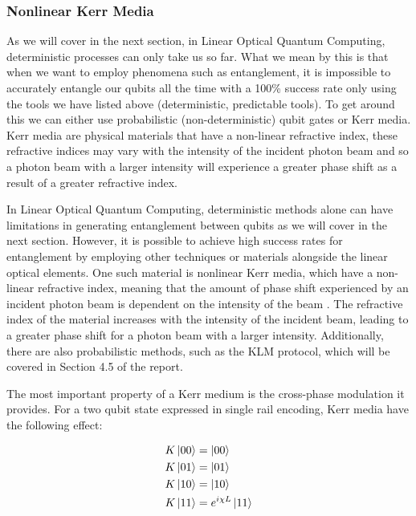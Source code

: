 \subsubsection{Nonlinear Kerr Media}
As we will cover in the next section, in Linear Optical Quantum Computing, deterministic processes can only take us so far. What we mean by this is that when we want to employ phenomena such as entanglement, it is impossible to accurately entangle our qubits all the time with a 100\% success rate only using the tools we have listed above (deterministic, predictable tools). To get around this we can either use probabilistic (non-deterministic) qubit gates or Kerr media. Kerr media are physical materials that have a non-linear refractive index, these refractive indices may vary with the intensity of the incident photon beam and so a photon beam with a larger intensity will experience a greater phase shift as a result of a greater refractive index.

In Linear Optical Quantum Computing, deterministic methods alone can have limitations in generating entanglement between qubits as we will cover in the next section. However, it is possible to achieve high success rates for entanglement  by employing other techniques or materials alongside the linear optical elements. One such material is nonlinear Kerr media, which have a non-linear refractive index, meaning that the amount of phase shift experienced by an incident photon beam is dependent on the intensity of the beam \cite{nielsen_chuang_2010}. The refractive index of the material increases with the intensity of the incident beam, leading to a greater phase shift for a photon beam with a larger intensity. Additionally, there are also probabilistic methods, such as the KLM protocol, which will be covered in Section 4.5 of the report.



\par 
The most important property of a Kerr medium is the cross-phase modulation it provides. For a two qubit state expressed in single rail encoding, Kerr media have the following effect:

\begin{align*} 
    K \ket{00} &=  \ket{00}\\
    K \ket{01} &=  \ket{01}\\
    K \ket{10} &=  \ket{10}\\
    K \ket{11} &=  e^{i\chi L}\ket{11}
    \end{align*}
    
